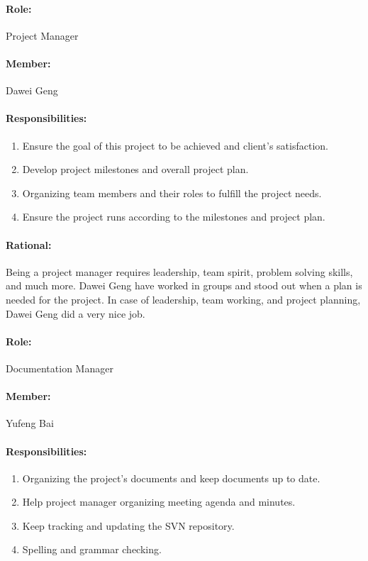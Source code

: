 \documentclass[11pt, a4paper]{report}
\begin{document}
\paragraph{Role: } Project Manager
\paragraph{Member: } Dawei Geng
\paragraph{Responsibilities: }
\begin{enumerate}
	\item  Ensure the goal of this project to be achieved and client's satisfaction.
	\item  Develop project milestones and overall project plan.
	\item  Organizing team members and their roles to fulfill the project needs.
	\item  Ensure the project runs according to the milestones and project plan.
\end{enumerate}
\paragraph{Rational: \\}
Being a project manager requires leadership, team spirit, problem solving skills, and much more. Dawei Geng have worked in groups and stood out when a plan is needed for the project. In case of leadership, team working, and project planning, Dawei Geng did a very nice job. 

\paragraph{Role: } Documentation Manager
\paragraph{Member: } Yufeng Bai
\paragraph{Responsibilities: }
\begin{enumerate}
	\item  Organizing the project's documents and keep documents up to date.
	\item  Help project manager organizing meeting agenda and minutes.
	\item  Keep tracking and updating the SVN repository.
	\item  Spelling and grammar checking.
\end{enumerate}
\end{document}

